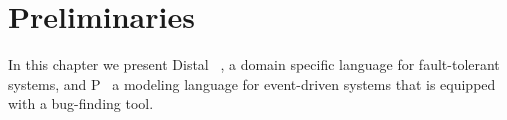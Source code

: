 \chapter{Preliminaries}
\label{preliminaries}

In this chapter we present Distal~ \cite{biely_distal_2013}, a domain specific language for fault-tolerant systems, and P~\cite{desai_p_2013} a modeling language for event-driven systems that is equipped with a bug-finding tool. 










